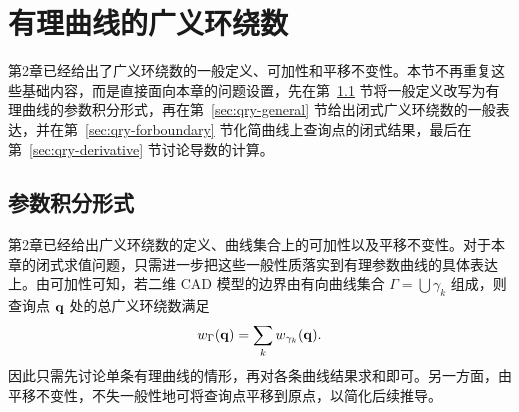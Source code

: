 \section{有理曲线的广义环绕数} \label{sec:qry-method}
第2章已经给出了广义环绕数的一般定义、可加性和平移不变性。本节不再重复这些基础内容，而是直接面向本章的问题设置，先在第~\ref{sec:qry-winding} 节将一般定义改写为有理曲线的参数积分形式，再在第~\ref{sec:qry-general} 节给出闭式广义环绕数的一般表达，并在第~\ref{sec:qry-forboundary} 节化简曲线上查询点的闭式结果，最后在第~\ref{sec:qry-derivative} 节讨论导数的计算。

\subsection{参数积分形式}\label{sec:qry-winding}
第2章已经给出广义环绕数的定义、曲线集合上的可加性以及平移不变性。对于本章的闭式求值问题，只需进一步把这些一般性质落实到有理参数曲线的具体表达上。由可加性可知，若二维 CAD 模型的边界由有向曲线集合 $\Gamma = \bigcup \gamma_k$ 组成，则查询点 $\mathbf{q}$ 处的总广义环绕数满足
\begin{equation}
w_{\Gamma}(\mathbf{q}) = \sum_k w_{\gamma_k}(\mathbf{q}).
\end{equation}
因此只需先讨论单条有理曲线的情形，再对各条曲线结果求和即可。另一方面，由平移不变性，不失一般性地可将查询点平移到原点，以简化后续推导。

